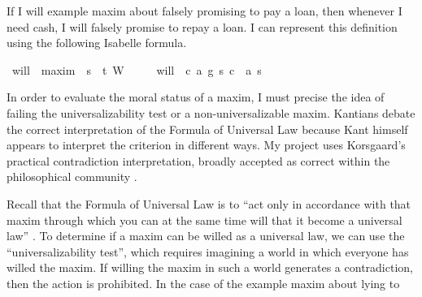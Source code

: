 \begin{isabellebody}
\begin{isamarkuptext}
If I will example  maxim about falsely promising to pay a loan, then whenever I need cash, 
I will falsely promise to repay a loan. I can represent this definition using the following Isabelle
formula.%
\end{isamarkuptext}\isamarkuptrue%
\isamarkupfalse%
\ will\ {\isacharcolon}{\isacharcolon}\ {\isachardoublequoteopen}maxim\ {\isasymRightarrow}\ s{\isasymRightarrow}\ \ t{\isachardoublequoteclose}\ {\isacharparenleft}{\isachardoublequoteopen}W\ {\isacharunderscore}\ {\isacharunderscore}{\isachardoublequoteclose}{\isacharparenright}\isanewline
\ \ \ {\isachardoublequoteopen}will\ {\isasymequiv}\ {\isasymlambda}{\isacharparenleft}c{\isacharcomma}\ a{\isacharcomma}\ g{\isacharparenright}\ s{\isachardot}\ {\isacharparenleft}c\ \isactrlbold {\isasymrightarrow}\ {\isacharparenleft}a\ s{\isacharparenright}{\isacharparenright}{\isachardoublequoteclose}\isanewline
%
%
\isadelimdocument
%
\endisadelimdocument
%
\isatagdocument
%
\isamarkuptrue%
%
\endisatagdocument
{\isafolddocument}%
%
\isadelimdocument
%
\endisadelimdocument
%
\begin{isamarkuptext}%
In order to evaluate the moral status of a maxim, I must precise the idea of failing
the universalizability test or a non-universalizable maxim.  Kantians debate the correct interpretation of 
the Formula of Universal Law because Kant himself appears to interpret the criterion in different ways. 
My project uses Korsgaard's practical contradiction interpretation, broadly accepted as correct within 
the philosophical community \citep{ebelsduggan}.
 
Recall that the Formula of Universal Law is to “act only in accordance with that maxim through which 
you can at the same time will that it become a universal law” \citep{groundwork}. To determine if a 
maxim can be willed as a universal law, we can use the “universalizability test”, which requires 
imagining a world in which everyone has willed the maxim. If willing the maxim in such a world 
generates a contradiction, then the action is prohibited. In the case of the example maxim about 
lying to 


\end{isamarkuptext}
\end{isabellebody}
